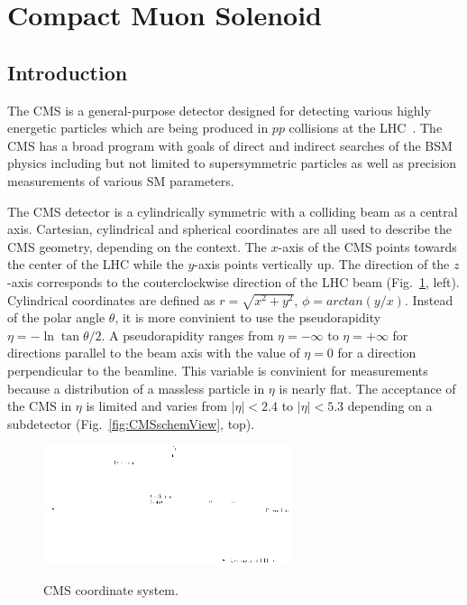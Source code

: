 \section{Compact Muon Solenoid}
\label{sec:Exp_CMS}
\subsection{Introduction}

The CMS is a general-purpose detector designed for detecting various highly energetic particles which are being produced in $pp$ collisions at the LHC~\cite{ref_CMS_TDR}. The CMS has a broad program with goals of direct and indirect searches of the BSM physics including but not limited to supersymmetric particles as well as precision measurements of various SM parameters. 


The CMS detector is a cylindrically symmetric with a colliding beam as a central axis. Cartesian, cylindrical and spherical coordinates are all used to describe the CMS geometry, depending on the context. The $x$-axis of the CMS points towards the center of the LHC while the $y$-axis points vertically up. The direction of the $z$-axis corresponds to the couterclockwise direction of the LHC beam (Fig.~\ref{fig:CMScoord}, left). Cylindrical coordinates are defined as $r=\sqrt{x^2+y^2}$, $\phi=arctan(y/x)$. Instead of the polar angle $\theta$, it is more convinient to use the pseudorapidity $\eta=-\ln{\tan{\theta/2}}$. A pseudorapidity ranges from $\eta=-\infty$ to $\eta=+\infty$ for directions parallel to the beam axis with the value of $\eta=0$ for a direction perpendicular to the beamline. This variable is convinient for measurements because a distribution of a massless particle in $\eta$ is nearly flat. The acceptance of the CMS in $\eta$ is limited and varies from $|\eta|<2.4$ to $|\eta|<5.3$ depending on a subdetector (Fig.~\ref{fig:CMSschemView}, top).   

\begin{figure}[htb]
  \begin{center}
    {\includegraphics[width=0.65\textwidth]{../figs/Exp/CMScoord.png}}
    \caption{CMS coordinate system. }
    \label{fig:CMScoord}
  \end{center}
\end{figure}

